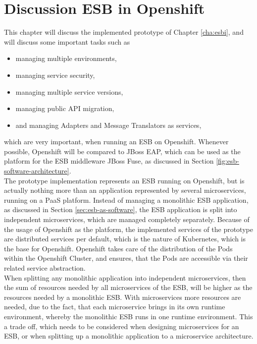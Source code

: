 \chapter{Discussion ESB in Openshift}
\label{cha:esbd}
This chapter will discuss the implemented prototype of Chapter \vref{cha:esbi}, and will discuss some important tasks such as 
\begin{itemize}
	\item managing multiple environments,
	\item managing service security,
	\item managing multiple service versions,
	\item managing public API migration,
	\item and managing Adapters and Message Translators as services,
\end{itemize}
which are very important, when running an ESB on Openshift. Whenever possible, Openshift will be compared to JBoss EAP, which can be used as the platform for the ESB middleware JBoss Fuse, as discussed in Section \vref{fig:esb-software-architecture}. \\

The prototype implementation represents an ESB running on Openshift, but is actually nothing more than an application represented by several microservices, running on a PaaS platform. Instead of managing a monolithic ESB application, as discussed in Section \vref{sec:esb-as-software}, the ESB application is split into independent microservices, which are managed completely separately. Because of the usage of Openshift as the platform, the implemented services of the prototype are distributed services per default, which is the nature of Kubernetes, which is the base for Openshift. Openshift takes care of the distribution of the Pods within the Openshift Cluster, and ensures, that the Pods are accessible via their related service abstraction. \\

When splitting any monolithic application into independent microservices, then the sum of resources needed by all microservices of the ESB, will be higher as the resources needed by a monolithic ESB. With microservices more resources are needed, due to the fact, that each microservice brings in its own runtime environment, whereby the monolithic ESB runs in one runtime environment. This a trade off, which needs to be considered when designing microservices for an ESB, or when splitting up a monolithic application to a microservice architecture. \\

